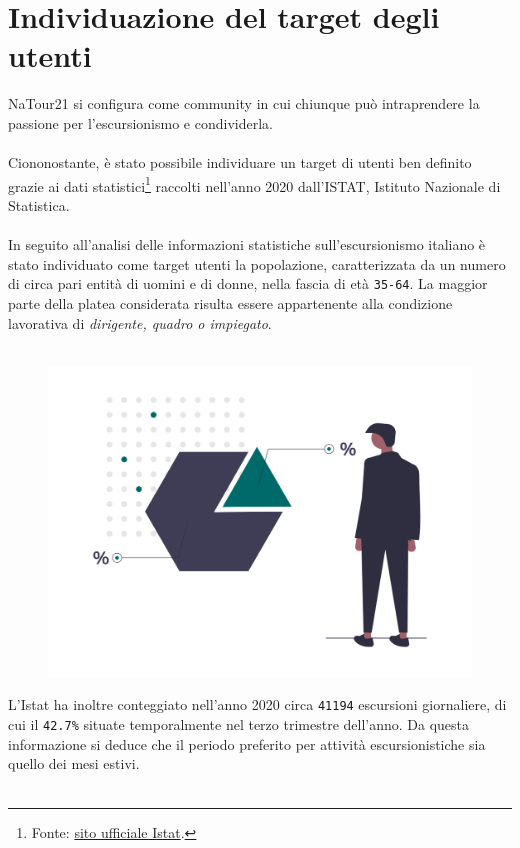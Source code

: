 \documentclass{natourDoc}
\begin{document}
	\section{Individuazione del target degli utenti}
	NaTour21 si configura come community in cui chiunque può intraprendere la passione per l'escursionismo e condividerla.\\\\
	Ciononostante, è stato possibile individuare un target di utenti ben definito grazie ai dati 
	statistici\footnote{Fonte: \href{http://dati.istat.it/Index.aspx?DataSetCode=DCCV_ESC_CAPI}{sito ufficiale Istat}.} raccolti 
	nell'anno 2020 dall'ISTAT, Istituto Nazionale di Statistica.\\\\
	In seguito all'analisi delle informazioni statistiche sull'escursionismo italiano è stato individuato come target utenti la popolazione, caratterizzata da un 
	numero di circa pari entità di uomini e di donne, nella fascia di età \texttt{35-64}. La maggior parte della 
	platea considerata risulta essere appartenente alla condizione lavorativa di \textit{dirigente, quadro o impiegato}.\\\\
	\begin{figure}[!htbp]
		\centering
		\includegraphics[width=12cm, page=1]{./logos/undraw_statistic_chart_38b6.png}
	\end{figure}
	\FloatBarrier
	L'Istat ha inoltre conteggiato nell'anno 2020 circa \texttt{41194} escursioni giornaliere,
	di cui il \texttt{42.7\%} situate temporalmente nel terzo trimestre dell'anno. Da questa informazione si deduce che il periodo
	preferito per attività escursionistiche sia quello dei mesi estivi.\\\\
\end{document}
